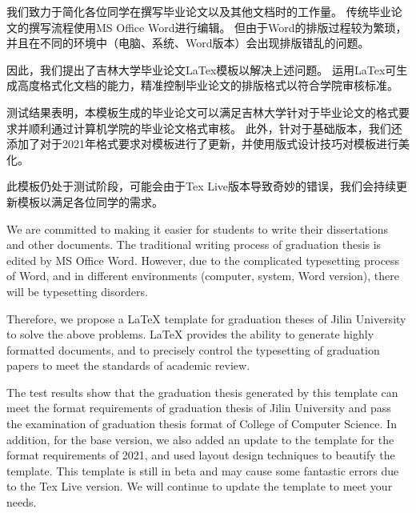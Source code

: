 \begin{cabstract}
我们致力于简化各位同学在撰写毕业论文以及其他文档时的工作量。
传统毕业论文的撰写流程使用MS Office Word进行编辑。
但由于Word的排版过程较为繁琐，并且在不同的环境中（电脑、系统、Word版本）会出现排版错乱的问题。

因此，我们提出了吉林大学毕业论文LaTex模板以解决上述问题。
运用LaTex可生成高度格式化文档的能力，精准控制毕业论文的排版格式以符合学院审核标准。

测试结果表明，本模板生成的毕业论文可以满足吉林大学针对于毕业论文的格式要求并顺利通过计算机学院的毕业论文格式审核。
此外，针对于基础版本，我们还添加了对于2021年格式要求对模板进行了更新，并使用版式设计技巧对模板进行美化。

此模板仍处于测试阶段，可能会由于Tex Live版本导致奇妙的错误，我们会持续更新模板以满足各位同学的需求。
\end{cabstract}

\begin{eabstract}
We are committed to making it easier for students to write their dissertations and other documents.
The traditional writing process of graduation thesis is edited by MS Office Word.
However, due to the complicated typesetting process of Word, and in different environments (computer, system, Word version), there will be typesetting disorders.

Therefore, we propose a LaTeX template for graduation theses of Jilin University to solve the above problems.
LaTeX provides the ability to generate highly formatted documents, and to precisely control the typesetting of graduation papers to meet the standards of academic review.

The test results show that the graduation thesis generated by this template can meet the format requirements of graduation thesis of Jilin University and pass the examination of graduation thesis format of College of Computer Science.
In addition, for the base version, we also added an update to the template for the format requirements of 2021, and used layout design techniques to beautify the template.
This template is still in beta and may cause some fantastic errors due to the Tex Live version. We will continue to update the template to meet your needs.
\end{eabstract}
